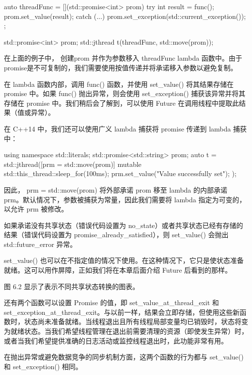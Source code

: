 \begin{cpp}
auto threadFunc = [](std::promise<int> prom) {
    try {
        int result = func();
        prom.set_value(result);
    } catch (...) {
        prom.set_exception(std::current_exception());
    }
};

std::promise<int> prom;
std::jthread t(threadFunc, std::move(prom));
\end{cpp}

在上面的例子中， 创建prom 并作为参数移入 threadFunc lambda 函数中。由于promise是不可复制的，我们需要使用按值传递并将承诺移入参数以避免复制。

在 lambda 函数内部，调用 func() 函数，并使用 set\_value() 将其结果存储在 promise 中。如果 func() 抛出异常，则会使用 set\_exception() 捕获该异常并将其存储在 promise 中。我们稍后会了解到，可以使用 Future 在调用线程中提取此结果（值或异常）。

在 C++14 中，我们还可以使用广义 lambda 捕获将 promise 传递到 lambda 捕获中：

\begin{cpp}
using namespace std::literals;
std::promise<std::string> prom;
auto t = std::jthread([prm = std::move(prom)] mutable {
    std::this_thread::sleep_for(100ms);
    prm.set_value("Value successfully set");
});
\end{cpp}

因此， prm = std::move(prom) 将外部承诺 prom 移至 lambda 的内部承诺 prm。默认情况下，参数被捕获为常量，因此我们需要将 lambda 指定为可变的，以允许 prm 被修改。

如果承诺没有共享状态（错误代码设置为 no\_state）或者共享状态已经有存储的结果（错误代码设置为 promise\_already\_satisfied），则 set\_value() 会抛出 std::future\_error 异常。

set\_value() 也可以在不指定值的情况下使用。在这种情况下，它只是使状态准备就绪。这可以用作屏障，正如我们将在本章后面介绍 Future 后看到的那样。

图 6.2 显示了表示不同共享状态转换的图表。


还有两个函数可以设置 Promise 的值，即 set\_value\_at\_thread\_exit 和 set\_exception\_at\_thread\_exit。与以前一样，结果会立即存储，但使用这些新函数时，状态尚未准备就绪。当线程退出且所有线程局部变量均已销毁时，状态将变为就绪状态。当我们希望线程管理在退出前需要清理的资源（即使发生异常）时，或者当我们希望提供准确的日志活动或监控线程退出时，此功能非常有用。

在抛出异常或避免数据竞争的同步机制方面，这两个函数的行为都与 set\_value() 和 set\_exception() 相同。

